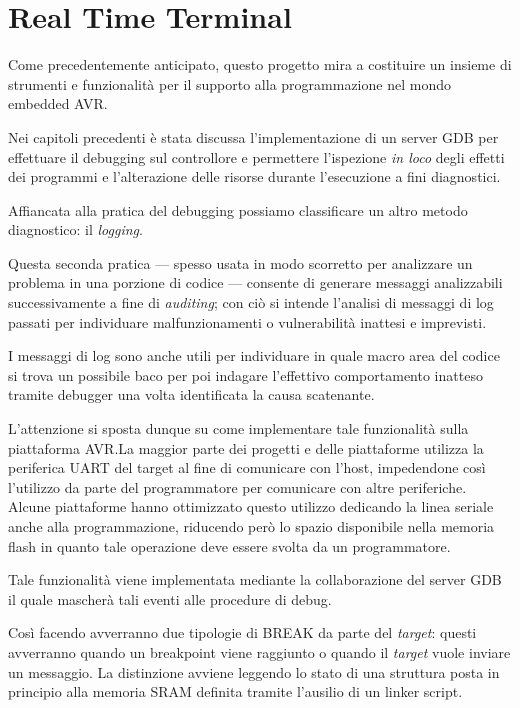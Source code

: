 \section{Real Time Terminal}

Come precedentemente anticipato, questo progetto mira a costituire un insieme di strumenti e funzionalità per il supporto alla programmazione nel mondo embedded AVR.\@

Nei capitoli precedenti è stata discussa l'implementazione di un server GDB per effettuare il debugging sul controllore e permettere l'ispezione \textit{in loco} degli effetti dei programmi e l'alterazione delle risorse durante l'esecuzione a fini diagnostici. 

Affiancata alla pratica del debugging possiamo classificare un altro metodo diagnostico: il \textit{logging}.

Questa seconda pratica --- spesso usata in modo scorretto per analizzare un problema in una porzione di codice --- consente di generare messaggi analizzabili successivamente a fine di \textit{auditing}; con ciò si intende l'analisi di messaggi di log passati per individuare malfunzionamenti o vulnerabilità inattesi e imprevisti.

I messaggi di log sono anche utili per individuare in quale macro area del codice si trova un possibile baco per poi indagare l'effettivo comportamento inatteso tramite debugger una volta identificata la causa scatenante.

L'attenzione si sposta dunque su come implementare tale funzionalità sulla piattaforma AVR.\@ La maggior parte dei progetti e delle piattaforme utilizza la periferica UART del target al fine di comunicare con l'host, impedendone così l'utilizzo da parte del programmatore per comunicare con altre periferiche. Alcune piattaforme hanno ottimizzato questo utilizzo dedicando la linea seriale anche alla programmazione, riducendo però lo spazio disponibile nella memoria flash in quanto tale operazione deve essere svolta da un programmatore. 

Tale funzionalità viene implementata %
mediante la collaborazione del server GDB il quale mascherà tali eventi alle procedure di debug.

Così facendo avverranno due tipologie di BREAK da parte del \textit{target}: questi avverranno quando un breakpoint viene raggiunto o quando il \textit{target} vuole inviare un messaggio. La distinzione avviene leggendo lo stato di una struttura posta in principio alla memoria SRAM definita tramite l'ausilio di un linker script.

